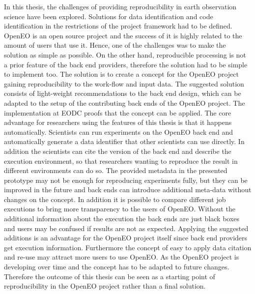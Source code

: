\documentclass[draft,final]{vutinfth} %
\begin{document}
In this thesis, the challenges of providing reproducibility in earth observation science have been explored. Solutions for data identification and code identification in the restrictions of the project framework had to be defined. OpenEO is an open source project and the success of it is highly related to the amount of users that use it. Hence, one of the challenges was to make the solution as simple as possible. On the other hand, reproducible processing is not a prior feature of the back end providers, therefore the solution had to be simple to implement too. The solution is to create a concept for the OpenEO project gaining reproducibility to the work-flow and input data. The suggested solution consists of light-weight recommendations to the back end design, which can be adapted to the setup of the contributing back ends of the OpenEO project. The implementation at EODC proofs that the concept can be applied. The core advantage for researchers using the features of this thesis is that it happens automatically. Scientists can run experiments on the OpenEO back end and automatically generate a data identifier that other scientists can use directly. In addition the scientists can cite the version of the back end and describe the execution environment, so that researchers wanting to reproduce the result in different environments can do so. The provided metadata in the presented prototype may not be enough for reproducing experiments fully, but they can be improved in the future and back ends can introduce additional meta-data without changes on the concept. In addition it is possible to compare different job executions to bring more transparency to the users of OpenEO. Without the additional information about the execution the back ends are just black boxes and users may be confused if results are not as expected. Applying the suggested additions is an advantage for the OpenEO project itself since back end providers get execution information. Furthermore the concept of easy to apply data citation and re-use may attract more users to use OpenEO. As the OpenEO project is developing over time and the concept has to be adapted to future changes. Therefore the outcome of this thesis can be seen as a starting point of reproducibility in the OpenEO project rather than a final solution.  
\end{document}
